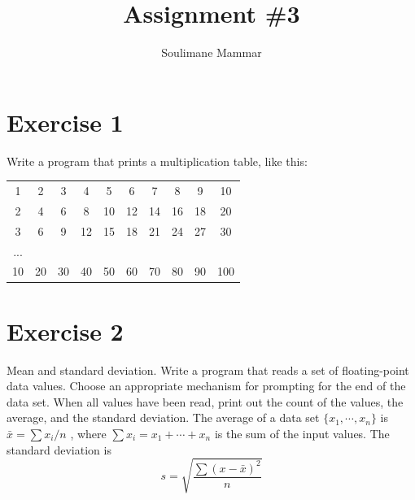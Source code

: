 \documentclass[10pt,a4paper]{article}
\title{Assignment \#3}
\author{Soulimane Mammar}
\begin{document}
	\maketitle
	\section*{Exercise 1}
	Write a program that prints a multiplication table, like this:
	
	\bigskip
	\begin{tabular}{cccccccccc}
		
		1 & 2 & 3 & 4 & 5 & 6 & 7 & 8 & 9 & 10 \\

		2 & 4 & 6 & 8 & 10 & 12 & 14 & 16 & 18 & 20 \\
		
		3 & 6 & 9 & 12 & 15 & 18 & 21 & 24 & 27 & 30 \\
		
		... &  &  &  &  &  &  &  &  &  \\
		
		10 & 20 & 30 & 40 & 50 & 60 & 70 & 80 & 90 & 100 \\
		
	\end{tabular}
	\section*{Exercise 2}
	Mean and standard deviation. Write a program that reads a set of floating-point data values. Choose an appropriate mechanism for prompting for the end of the data set. When all values have been read, print out the count of the values, the average, and	the standard deviation. The average of a data set $ \{x_1, \cdots, x_n\} $ is $ \bar{x} = \sum x_i / n $ , where	$ \sum x_i = x_1 +\cdots + x_n $ is the sum of the input values. The standard deviation is
	\begin{equation*}
		s = \sqrt{\dfrac{\sum (x-\bar{x})^2}{n}}
	\end{equation*}
\end{document}
